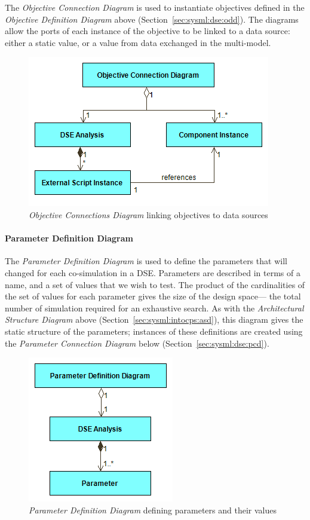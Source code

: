 The \emph{Objective Connection Diagram} is used to instantiate objectives defined in the \emph{Objective Definition Diagram} above (Section~\ref{sec:sysml:dse:odd}). The diagrams allow the ports of each instance of the objective to be linked to a data source: either a static value, or a value from data exchanged in the multi-model.

\begin{figure}[h!]
\centering
\includegraphics[scale=0.5]{figures/DSE/ObjectiveConnectionsView}
\caption{\emph{Objective Connections Diagram} linking objectives to data sources}
\label{fig:sysml:sysml:dse:ocd}
\end{figure}

\paragraph{Parameter Definition Diagram}
\label{sec:sysml:dse:pdd}

The \emph{Parameter Definition Diagram} is used to define the parameters that will changed for each co-simulation in a DSE. Parameters are described in terms of a name, and a set of values that we wish to test. The product of the cardinalities of the set of values for each parameter gives the size of the design space--- the total number of simulation required for an exhaustive search. As with the \emph{Architectural Structure Diagram} above (Section~\ref{sec:sysml:intocps:asd}), this diagram gives the static structure of the parameters; instances of these definitions are created using the \emph{Parameter Connection Diagram} below (Section~\ref{sec:sysml:dse:pcd}).

\begin{figure}[h!]
\centering
\includegraphics[scale=0.5]{figures/DSE/ParameterDefinitionView}
\caption{\emph{Parameter Definition Diagram} defining parameters and their values}
\label{fig:sysml:sysml:dse:pdd}
\end{figure}

